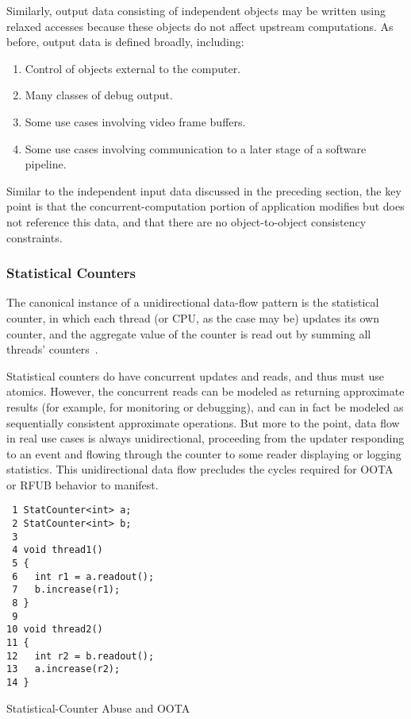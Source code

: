 \documentclass[10]{article}
\begin{document}
Similarly, output data consisting of independent objects may be written
using relaxed accesses because these objects do not affect upstream
computations.
As before, output data is defined broadly, including:

\begin{enumerate}
\item	Control of objects external to the computer.
\item	Many classes of debug output.
\item	Some use cases involving video frame buffers.
\item	Some use cases involving communication to a later stage of a
	software pipeline.
\end{enumerate}

Similar to the independent input data discussed in the preceding section,
the key point is that the concurrent-computation portion of application
modifies but does not reference this data, and that there are no
object-to-object consistency constraints.

\subsubsection{Statistical Counters}
\label{sec:Statistical Counters}

The canonical instance of a unidirectional data-flow pattern is the
statistical counter, in which each thread (or CPU, as the case may be)
updates its own counter, and the aggregate value of the counter is read
out by summing all threads'
counters~\cite[Section 5.2]{McKenney2018ParallelProgramming-2018-12-08a}.

Statistical counters do have concurrent updates and reads, and thus must
use atomics.
However, the concurrent reads can be modeled as returning approximate
results (for example, for monitoring or debugging), and can in fact be
modeled as sequentially consistent approximate operations.
But more to the point, data flow in real use cases is always
unidirectional, proceeding from the updater responding to an event
and flowing through the counter to some reader displaying or logging
statistics.
This unidirectional data flow precludes the cycles required for OOTA or
RFUB behavior to manifest.

\begin{listing}[tbp]
\begin{verbatim}
 1 StatCounter<int> a;
 2 StatCounter<int> b;
 3
 4 void thread1()
 5 {
 6   int r1 = a.readout();
 7   b.increase(r1);
 8 }
 9
10 void thread2()
11 {
12   int r2 = b.readout();
13   a.increase(r2);
14 }
\end{verbatim}
\caption{Statistical-Counter Abuse and OOTA}
\label{lst:Statistical-Counter Abuse and OOTA}
\end{listing}
\end{document}
